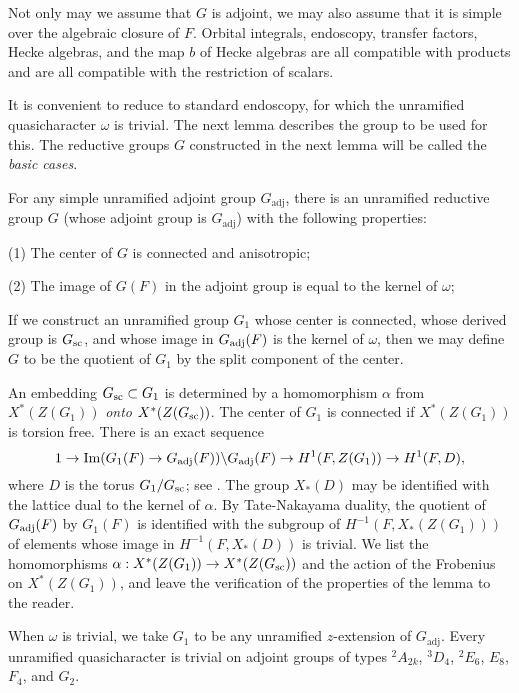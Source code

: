 \enddemo



Not only may we assume that $G$ is adjoint, we may also assume
that it is simple over the algebraic closure of $F$.  Orbital
integrals, endoscopy, transfer factors, Hecke algebras, and
the map $b$ of Hecke algebras are all compatible with products
and are all compatible with the restriction of scalars.

It is convenient
to reduce to standard endoscopy, for which the unramified quasicharacter
$\omega$ is trivial.  The next lemma describes the
group to be used for this.
The reductive groups $G$ constructed in the next lemma will be called the
{\it basic cases}.

  For any simple 
unramified adjoint group $G_{\text{adj}}$,
there is an unramified reductive group $G$
(whose adjoint group is $G_{\text{adj}}$) with the following properties:
\item{(1)}  The center of $G$ is connected and anisotropic;
\item{(2)} The image of $G(F)$ in the adjoint group is equal to the
kernel of $\omega$;
\endproclaim

  If we construct an unramified 
group $G_1$ whose center is connected,
whose derived group is $G_{\text{sc}}$, and whose image in $G_{\text{adj}}(F)$ is the
kernel of $\omega$, then we may define $G$ to be the quotient of $G_1$
by the split component of the center.  

An embedding $G_{{\text{sc}}}\subset G_1$
is determined by a homomorphism $\alpha$ from
$X^*(Z(G_1))$ {\it onto}  $X^*(Z(G_{{\text{sc}}}))$.  The center of $G_1$ is
connected if $X^*(Z(G_1))$ is torsion free.  
There is an exact sequence
$$1\to \text{Im}(G_1(F)\to G_{\text{adj}}(F))
	\backslash G_{\text{adj}}(F) \to H^1(F,Z(G_1))\to H^1(F,D),$$
where $D$ is the torus $G_1/G_{\text{sc}}$; see \cite{Ko3,1.5}.  The
group $X_*(D)$ may be identified with the lattice dual to the
kernel of $\alpha$.  By Tate-Nakayama duality, the quotient of
$G_{\text{adj}}(F)$ by $G_1(F)$ is identified with the subgroup
of $H^{-1}(F,X_*(Z(G_1)))$ of elements whose image in 
$H^{-1}(F,X_*(D))$ is trivial.
We list the
homomorphisms $\alpha:X^*(Z(G_1))\to X^*(Z(G_{{\text{sc}}}))$ and the action of
the Frobenius on $X^*(Z(G_1))$, and leave the verification of the
properties of the lemma to the reader.

When $\omega$ is trivial, we take $G_1$ to be any unramified $z$-extension
of $G_{\text{adj}}$.  Every unramified quasicharacter is trivial on
adjoint groups of types ${}^2A_{2k}$, ${}^3D_4$, ${}^2E_6$, $E_8$, $F_4$, and
$G_2$. 

